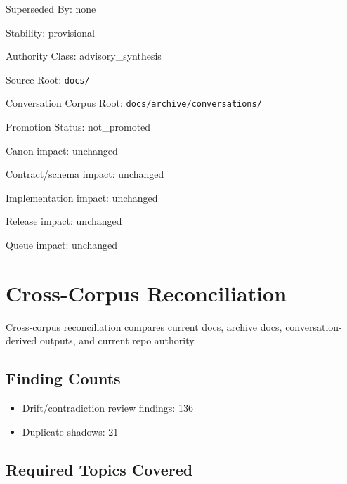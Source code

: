 \documentclass[10.5pt,a4paper]{book}
\begin{document}
Superseded By: none

Stability: provisional

Authority Class: advisory\_\allowbreak{}synthesis

Source Root: \texttt{docs/\allowbreak{}}

Conversation Corpus Root: \texttt{docs/\allowbreak{}archive/\allowbreak{}conversations/\allowbreak{}}

Promotion Status: not\_\allowbreak{}promoted

Canon impact: unchanged

Contract/\allowbreak{}schema impact: unchanged

Implementation impact: unchanged

Release impact: unchanged

Queue impact: unchanged


\part{Cross-\allowbreak{}Corpus Reconciliation}

Cross-\allowbreak{}corpus reconciliation compares current docs, archive docs, conversation-\allowbreak{}derived outputs, and current repo authority.\allowbreak{}


\chapter{Finding Counts}

\begin{itemize}
\item Drift/\allowbreak{}contradiction review findings: 136
\item Duplicate shadows: 21
\end{itemize}

\chapter{Required Topics Covered}
\end{document}
